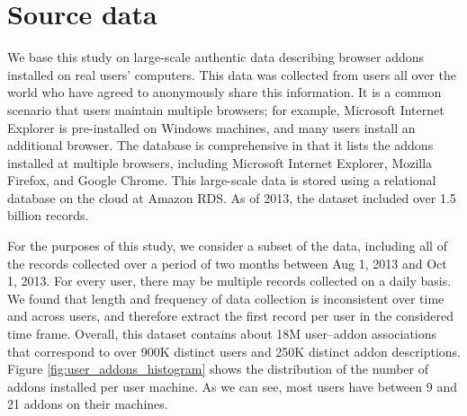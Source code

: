\documentclass[ijoc,nonblindrev]{informs3} %
\numberwithin{equation}{subsection}
\begin{document}

\section{Source data}
\label{sec:datasets}

We base this study on large-scale authentic data describing browser addons installed on real users' computers. This data was collected from users all over the world who have agreed to anonymously share this information. It is a common scenario that users maintain multiple browsers; for example, Microsoft Internet Explorer is pre-installed on Windows machines, and many users install an additional browser. The database is comprehensive in that it lists the addons installed at multiple browsers, including Microsoft Internet Explorer, Mozilla Firefox, and Google Chrome. This large-scale data is stored using a relational database on the cloud at Amazon RDS. As of 2013, the dataset included over 1.5 billion records. 

For the purposes of this study, we consider a subset of the data, including all of the records collected over a period of two months between Aug 1, 2013 and Oct 1, 2013. For every user, there may be multiple records collected on a daily basis. We found that length and frequency of data collection is inconsistent over time and across users, and therefore extract the first record per user in the considered time frame. Overall, this dataset contains about 18M user--addon associations that correspond to over 900K distinct users and 250K distinct addon descriptions. Figure \ref{fig:user_addons_histogram} shows the distribution of the number of addons installed per user machine. As we can see,  most users have between 9 and 21 addons on their machines.
\end{document}
